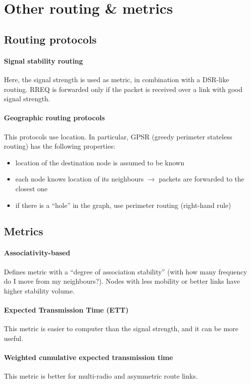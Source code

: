 \section{Other routing \& metrics}

\subsection{Routing protocols}

\paragraph*{Signal stability routing} Here, the signal strength is used as
metric, in combination with a DSR-like routing. RREQ is forwarded only if the
packet is received over a link with good signal strength.

\paragraph*{Geographic routing protocols} This protocols use location. In
particular, GPSR (greedy perimeter stateless routing) has the following
properties:
\begin{itemize}
\item location of the destination node is assumed to be known
\item each node knows location of its neighbours $\to$ packets are forwarded to
  the closest one
\item if there is a ``hole'' in the graph, use perimeter routing (right-hand rule) 
\end{itemize}

\subsection{Metrics}

\paragraph*{Associativity-based} 
Defines metric with a ``degree of association stability'' (with how many
frequency do I move from my neighbours?). Nodes with less mobility or better
links have higher stability volume.

\paragraph*{Expected Transmission Time (ETT)} This metric is easier to computer
than the signal strength, and it can be more useful.

\paragraph*{Weighted cumulative expected transmission time} This metric is
better for multi-radio and asymmetric route links.
